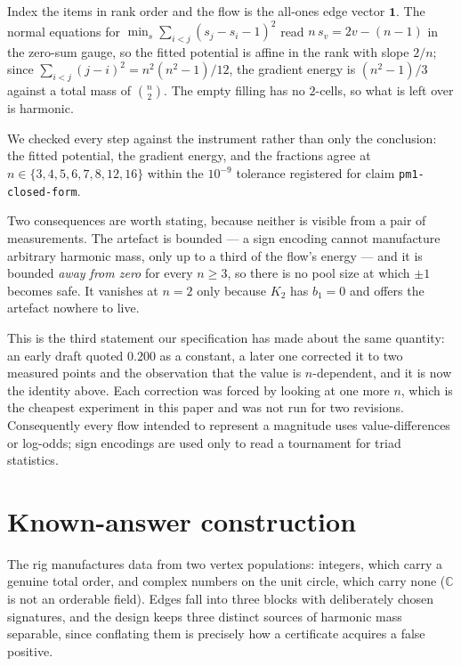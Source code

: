 \documentclass[11pt,a4paper]{article}
\begin{document}
Index the items in rank order and the flow is the all-ones edge vector
$\mathbf{1}$. The normal equations for $\min_s \sum_{i<j}(s_j - s_i - 1)^2$ read
$n\,s_v = 2v - (n-1)$ in the zero-sum gauge, so the fitted potential is affine in
the rank with slope $2/n$; since $\sum_{i<j}(j-i)^2 = n^2(n^2-1)/12$, the
gradient energy is $(n^2-1)/3$ against a total mass of $\binom{n}{2}$. The empty
filling has no $2$-cells, so what is left over is harmonic.

We checked every step against the instrument rather than only the conclusion:
the fitted potential, the gradient energy, and the fractions agree at
$n\in\{3,4,5,6,7,8,12,16\}$ within the $10^{-9}$ tolerance registered for claim
\texttt{pm1-closed-form}.

Two consequences are worth stating, because neither is visible from a pair of
measurements. The artefact is bounded --- a sign encoding cannot manufacture
arbitrary harmonic mass, only up to a third of the flow's energy --- and it is
bounded \emph{away from zero} for every $n \ge 3$, so there is no pool size at
which $\pm 1$ becomes safe. It vanishes at $n = 2$ only because $K_2$ has
$b_1 = 0$ and offers the artefact nowhere to live.

This is the third statement our specification has made about the same quantity:
an early draft quoted $0.200$ as a constant, a later one corrected it to two
measured points and the observation that the value is $n$-dependent, and it is
now the identity above. Each correction was forced by looking at one more $n$,
which is the cheapest experiment in this paper and was not run for two
revisions. Consequently every flow intended to represent a magnitude uses
value-differences or log-odds; sign encodings are used only to read a tournament
for triad statistics.

\section{Known-answer construction}

The rig manufactures data from two vertex populations: integers, which carry a
genuine total order, and complex numbers on the unit circle, which carry none
($\mathbb{C}$ is not an orderable field). Edges fall into three blocks with
deliberately chosen signatures, and the design keeps three distinct sources of
harmonic mass separable, since conflating them is precisely how a certificate
acquires a false positive.
\end{document}
